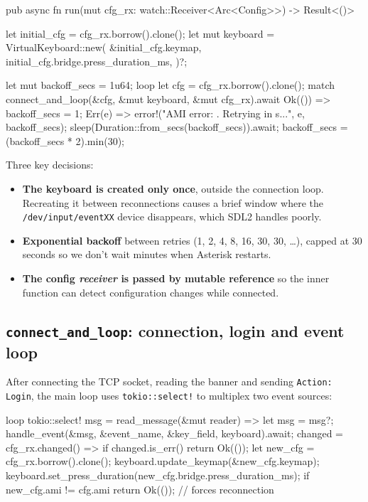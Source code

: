 \begin{rustcode}
pub async fn run(mut cfg_rx: watch::Receiver<Arc<Config>>) -> Result<()> {
    let initial_cfg = cfg_rx.borrow().clone();
    let mut keyboard = VirtualKeyboard::new(
        &initial_cfg.keymap,
        initial_cfg.bridge.press_duration_ms,
    )?;

    let mut backoff_secs = 1u64;
    loop {
        let cfg = cfg_rx.borrow().clone();
        match connect_and_loop(&cfg, &mut keyboard, &mut cfg_rx).await {
            Ok(()) => {
                backoff_secs = 1;
            }
            Err(e) => {
                error!("AMI error: {}. Retrying in {}s...", e, backoff_secs);
                sleep(Duration::from_secs(backoff_secs)).await;
                backoff_secs = (backoff_secs * 2).min(30);
            }
        }
    }
}
\end{rustcode}

Three key decisions:

\begin{itemize}
  \item \textbf{The keyboard is created only once}, outside the connection loop. Recreating it between reconnections causes a brief window where the \texttt{/dev/input/eventXX} device disappears, which SDL2 handles poorly.
  \item \textbf{Exponential backoff} between retries (1, 2, 4, 8, 16, 30, 30, \ldots), capped at 30 seconds so we don't wait minutes when Asterisk restarts.
  \item \textbf{The config \emph{receiver} is passed by mutable reference} so the inner function can detect configuration changes while connected.
\end{itemize}

\subsection{\texttt{connect\_and\_loop}: connection, login and event loop}

After connecting the TCP socket, reading the banner and sending \texttt{Action: Login}, the main loop uses \texttt{tokio::select!} to multiplex two event sources:

\begin{rustcode}
loop {
    tokio::select! {
        msg = read_message(&mut reader) => {
            let msg = msg?;
            handle_event(&msg, &event_name, &key_field, keyboard).await;
        }
        changed = cfg_rx.changed() => {
            if changed.is_err() { return Ok(()); }
            let new_cfg = cfg_rx.borrow().clone();
            keyboard.update_keymap(&new_cfg.keymap);
            keyboard.set_press_duration(new_cfg.bridge.press_duration_ms);
            if new_cfg.ami != cfg.ami {
                return Ok(()); // forces reconnection
            }
        }
    }
}
\end{rustcode}

